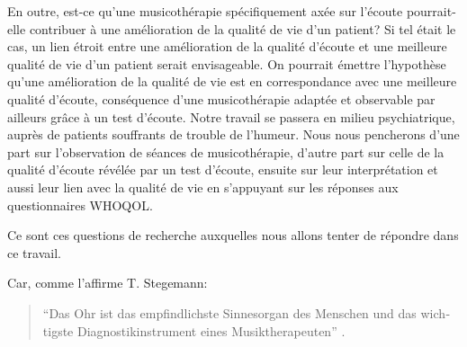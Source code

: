  En outre, est-ce qu'une musicothérapie spécifiquement axée sur l'écoute pourrait-elle  contribuer à une 
amélioration de la qualité de vie d'un patient? 
Si tel était  le cas, un lien étroit entre une amélioration de la 
qualité d'écoute  et une meilleure qualité de vie  d'un patient serait envisageable.
On pourrait émettre l'hypothèse qu'une amélioration de la qualité de vie est en correspondance avec une 
meilleure qualité d'écoute, conséquence d'une musicothérapie adaptée et observable par ailleurs grâce à 
un test d'écoute.
  Notre travail se passera  en milieu psychiatrique, 
auprès de patients souffrants de trouble de l'humeur.
Nous  nous pencherons d'une part sur l'observation de séances de musicothérapie, 
d'autre part sur celle de la qualité d'écoute révélée par un test d'écoute, ensuite sur leur interprétation
 et aussi leur lien avec la qualité de vie en s'appuyant sur les réponses aux questionnaires  
WHOQOL.  



Ce sont ces questions de recherche auxquelles nous allons tenter de répondre dans ce travail.


Car, comme l'affirme T. Stegemann:
\begin{quotation}
	\begin{german}
	``Das Ohr ist das empfindlichste
    Sinnesorgan des Menschen und das wichtigste Diagnostikinstrument
    eines Musiktherapeuten'' \autocite[p. 44]{seminar_zuerich}.
\end{german}
 \end{quotation}


 
